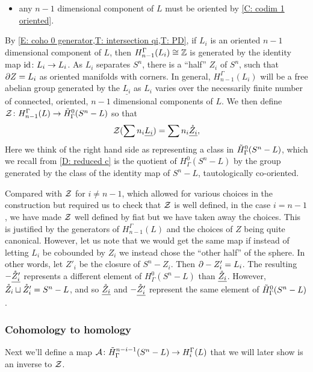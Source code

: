 \begin{example}
\begin{itemize}
\item any $n-1$ dimensional component of $L$ must be oriented by \cref{C: codim 1 oriented}.
\end{itemize}

By \cref{E: coho 0 generator,T: intersection qi,T: PD}, if $L_i$ is an oriented $n-1$ dimensional component of $L$, then $H_{n-1}^\Gamma(L_i) \cong \mathbb{Z}$ is generated by the identity map $\mathrm{id} \colon L_i \to L_i$.
As $L_i$ separates $S^n$, there is a ``half'' $Z_i$ of $S^n$, such that $\partial Z = L_i$ as oriented manifolds with corners.
In general, $H_{n-1}^\Gamma(L_i)$ will be a free abelian group generated by the $\underline{L_i}$ as $L_i$ varies over the necessarily finite number of connected, oriented, $n-1$ dimensional components of $L$.
We then define $\mathcal{Z} \colon H_{n-1}^\Gamma(L) \to \tilde H^{0}_\Gamma(S^n-L)$ so that $$\mathcal{Z}(\sum n_i \underline{L_i}) = \sum n_i \underline{\mathring{Z}_i},$$
Here we think of the right hand side as representing a class in $\tilde H^{0}_\Gamma(S^n-L)$, which we recall from \cref{D: reduced c} is the quotient of $H^{0}_\Gamma(S^n-L)$ by the group generated by the class of the identity map of $S^n-L$, tautologically co-oriented.

Compared with $\mathcal{Z}$ for $i \neq n-1$, which allowed for various choices in the construction but required us to check that $\mathcal{Z}$ is well defined, in the case $i = n-1$, we have made $\mathcal{Z}$ well defined by fiat but we have taken away the choices.
This is justified by the generators of $H_{n-1}^\Gamma(L)$ and the choices of $Z$ being quite canonical.
However, let us note that we would get the same map if instead of letting $L_i$ be cobounded by $Z_i$ we instead chose the ``other half'' of the sphere.
In other words, let $Z'_i$ be the closure of $S^n-Z_i$.
Then $\partial -Z'_i = L_i$.
The resulting $-\underline{\mathring{Z}'_i}$ represents a different element of $H^{0}_\Gamma(S^n-L)$ than $\underline {\mathring{Z}_i}$.
However, $\mathring{Z}_i \sqcup \mathring{Z}_i' = S^n-L$, and so $\underline {\mathring{Z}_i}$ and  $-\underline{\mathring{Z}'_i}$ represent the same element of $\tilde H^0_\Gamma(S^n - L)$.



\subsubsection{Cohomology to homology}
Next we'll define a map $\mathcal{A} \colon \tilde H^{n-i-1}_\Gamma(S^n-L) \to H_i^\Gamma(L)$ that we will later show is an inverse to $\mathcal{Z}$.


\end{example}
